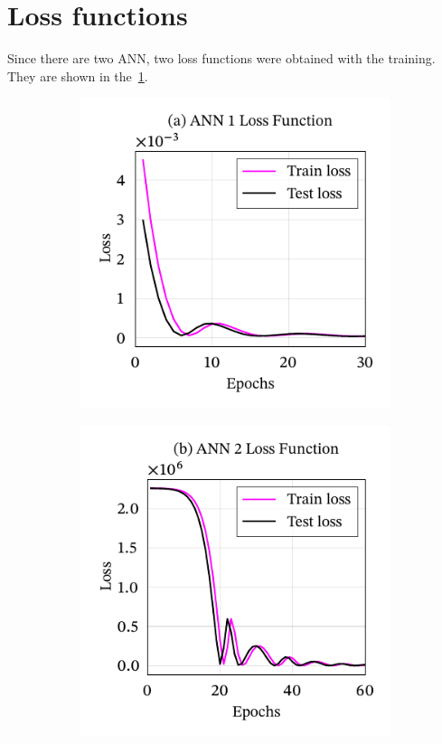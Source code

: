 \section{Loss functions}

Since there are two ANN, two loss functions were obtained with the training. They are shown in the~\cref{fig:test_loss}.

\begin{figure}[!htb]
    \centering
    \caption[Loss Functions Behavior]{Loss Functions Behavior. The total number of epochs is 500 and was omitted because they were approximating a straight line.}
    \begin{subfigure}{0.49\textwidth}
        \centering
        \includegraphics{figures/4results/uav/loss_function_nn1.pdf}
    \end{subfigure}
    \hfill
    \begin{subfigure}{0.49\textwidth}
        \centering
        \includegraphics{figures/4results/uav/loss_function_nn2.pdf}
    \end{subfigure}

    \label{fig:test_loss}
\end{figure}

